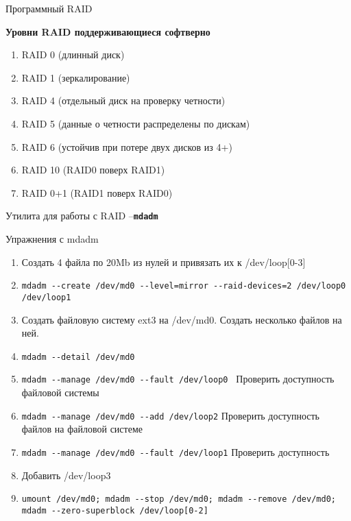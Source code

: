 \begin{frame}{Программный RAID}
  \begin{center}
    \textbf{Уровни RAID поддерживающиеся софтверно}
   \end{center}
   \begin{enumerate}
     \item RAID 0 (длинный диск)
     \pause
     \item RAID 1 (зеркалирование)
     \pause 
     \item RAID 4 (отдельный диск на проверку четности)
     \pause
     \item RAID 5 (данные о четности распределены по дискам)
     \pause
     \item RAID 6 (устойчив при потере двух дисков из 4+)
     \pause
     \item RAID 10 (RAID0 поверх RAID1)
     \pause
     \item RAID 0+1 (RAID1 поверх RAID0)
   \end{enumerate}
   \pause
   Утилита для работы с RAID --\textbf{\tt mdadm}
\end{frame}

\begin{frame}{Упражнения с mdadm}
    \begin{enumerate}
      \item Создать 4 файла по 20Mb из нулей и привязать их к /dev/loop[0-3]
      \item {\tt mdadm -\phantom{}-create /dev/md0 -\phantom{}-level=mirror -\phantom{}-raid-devices=2 /dev/loop0 /dev/loop1}
      \item Создать файловую систему ext3 на /dev/md0. Создать несколько файлов на ней.
      \item {\tt mdadm -\phantom{}-detail /dev/md0}
      \item {\tt mdadm -\phantom{}-manage /dev/md0 -\phantom{}-fault /dev/loop0 } Проверить доступность файловой системы
      \item {\tt mdadm -\phantom{}-manage /dev/md0 -\phantom{}-add /dev/loop2} Проверить доступность файлов на файловой системе
      \item {\tt mdadm -\phantom{}-manage /dev/md0 -\phantom{}-fault /dev/loop1} Проверить доступность
      \item Добавить /dev/loop3
      \item {\tt umount /dev/md0; mdadm -\phantom{}-stop /dev/md0; mdadm -\phantom{}-remove /dev/md0; mdadm -\phantom{}-zero-superblock /dev/loop[0-2]}
    \end{enumerate}
\end{frame}

